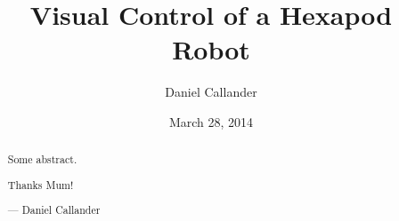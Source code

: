 \documentclass{l4proj}
\begin{document}
\title{Visual Control of a Hexapod Robot}
\author{Daniel Callander}
\date{March 28, 2014}
\maketitle


\begin{abstract}
Some abstract.
\end{abstract}

\renewcommand{\abstractname}{Acknowledgements}
\begin{abstract}
Thanks Mum!

--- Daniel Callander
\end{abstract}

\educationalconsent
\tableofcontents

 








\renewcommand{\bibname}{References}


\end{document}
